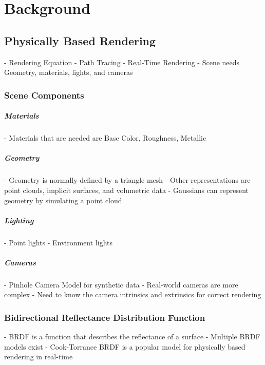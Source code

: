 \chapter{Background}
\label{chap:background}

\section{Physically Based Rendering}
- Rendering Equation
- Path Tracing
- Real-Time Rendering
- Scene needs Geometry, materials, lights, and cameras

\subsection{Scene Components}

\paragraph{Materials}
- Materials that are needed are Base Color, Roughness, Metallic

\paragraph{Geometry}
- Geometry is normally defined by a triangle mesh
- Other representations are point clouds, implicit surfaces, and volumetric data
- Gaussians can represent geometry by simulating a point cloud

\paragraph{Lighting}
- Point lights
- Environment lights

\paragraph{Cameras}
- Pinhole Camera Model for synthetic data
- Real-world cameras are more complex
- Need to know the camera intrinsics and extrinsics for correct rendering

\subsection{Bidirectional Reflectance Distribution Function}
- BRDF is a function that describes the reflectance of a surface
- Multiple BRDF models exist
- Cook-Torrance BRDF is a popular model for physically based rendering in real-time


